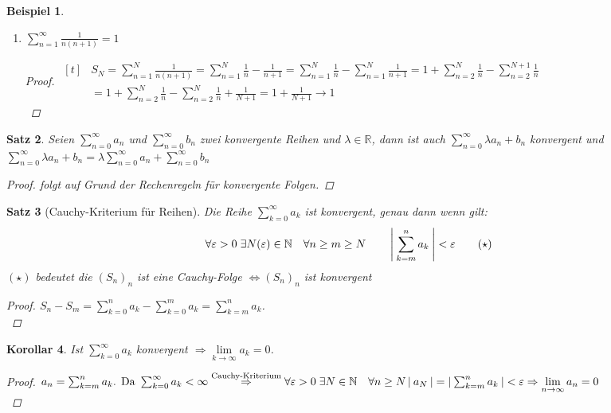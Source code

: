 \documentclass[a4paper,titlepage,oneside]{article}
\def\N{\ensuremath{\mathbb{N}} }
\def\R{\ensuremath{\mathbb{R}} }
\renewcommand{\epsilon}{\ensuremath{\varepsilon} }
\def\sp{\hspace{0,1cm}}
\newcommand{\suminf}[2][n]{\ensuremath{\sum_{#1= 0}^{\infty}{#2}}}
\newcommand{\Suminf}[2][n]{\ensuremath{\sum_{#1=1}^{\infty}{#2}}}
\renewcommand{\liminf}[2][n]{\ensuremath{\lim\limits_{#1 \rightarrow \infty}{#2}}}
\newcommand{\abs}[1]{\ensuremath{\left|\:#1\:\right|}}
\theoremstyle{thmstyle}
\newtheorem{satz}{Satz}[subsection]
\newtheorem{korr}[satz]{Korollar}
\newtheorem{bsp}[satz]{Beispiel}
\begin{document}
\begin{bsp}
\begin{enumerate}
\item $ \Suminf{\frac{1}{n(n+1)}}= 1 $
\begin{proof}
$\begin{aligned}[t]
&S_N = \sum_{n=1}^{N}{\frac{1}{n(n+1)}} = \sum_{n=1}^{N}{\frac{1}{n}} - \frac{1}{n+1} = \sum_{n=1}^{N}{\frac{1}{n}} - \sum_{n=1}^{N}{\frac{1}{n+1}}
= 1 + \sum_{n=2}^{N}{\frac{1}{n}} - \sum_{n=2}^{N+1}{\frac{1}{n}} \\
&= 1 + \sum_{n=2}^{N}{\frac{1}{n}} - \sum_{n=2}^{N}{\frac{1}{n}} + \frac{1}{N+1}
= 1 + \frac{1}{N+1} \longrightarrow 1
\end{aligned}$\\
\end{proof}
\end{enumerate}
\end{bsp}

\begin{satz}
Seien \suminf{a_n} und \suminf{b_n} zwei konvergente Reihen und \(\lambda \in \R\),
dann ist auch \(\suminf{\lambda a_n + b_n}\) konvergent und \( \suminf{\lambda a_n + b_n} = \lambda \suminf{a_n} + \suminf{b_n}\)
\begin{proof}
folgt auf Grund der Rechenregeln für konvergente Folgen.
\end{proof}
\end{satz}

\begin{satz}[Cauchy-Kriterium für Reihen]
Die Reihe \(\suminf[k]{a_k}\) ist konvergent, genau dann wenn gilt:
\[\forall \epsilon > 0 \sp \exists N(\epsilon) \in \N \quad \forall n \ge m \ge N \qquad \abs{\sum_{k=m}^{n}{a_k}} < \epsilon \qquad (\star)\]
\((\star)\) bedeutet die \((S_n)_n\) ist eine Cauchy-Folge \(\Leftrightarrow (S_n)_n\) ist konvergent
\begin{proof}
\(S_n - S_m = \sum_{k=0}^{n}{a_k} - \sum_{k=0}^{m}{a_k} = \sum_{k=m}^{n}{a_k}\).\\
\end{proof}
\end{satz}

\begin{korr}
Ist \suminf[k]{a_k} konvergent \(\Rightarrow \liminf[k]{a_k} = 0\).
\begin{proof}
\(a_n = \sum_{k = m}^{n}{a_k} \text{. Da } \suminf[k]{a_k} < \infty \overset{\text{Cauchy-Kriterium}}{\Rightarrow} \forall \epsilon > 0 \sp \exists N \in \N \quad \forall n \ge N \abs{a_N} = \abs{ \sum_{k = m}^{n}{a_k}} < \epsilon  \Rightarrow \liminf{a_n} = 0\)\\
\end{proof}
\end{korr}
\end{document}
